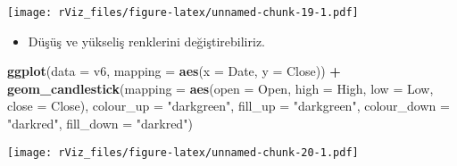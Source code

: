 \documentclass[
]{book}
\newenvironment{Shaded}{\begin{snugshade}}{\end{snugshade}}
\newcommand{\CommentTok}[1]{\textcolor[rgb]{0.56,0.35,0.01}{\textit{#1}}}
\newcommand{\DataTypeTok}[1]{\textcolor[rgb]{0.13,0.29,0.53}{#1}}
\newcommand{\KeywordTok}[1]{\textcolor[rgb]{0.13,0.29,0.53}{\textbf{#1}}}
\newcommand{\NormalTok}[1]{#1}
\newcommand{\OperatorTok}[1]{\textcolor[rgb]{0.81,0.36,0.00}{\textbf{#1}}}
\newcommand{\StringTok}[1]{\textcolor[rgb]{0.31,0.60,0.02}{#1}}
\providecommand{\tightlist}{%
  \setlength{\itemsep}{0pt}\setlength{\parskip}{0pt}}
\begin{document}
\begin{Shaded}
\end{Shaded}

\texttt{[image: rViz\_files/figure-latex/unnamed-chunk-19-1.pdf]}

\begin{itemize}
\tightlist
\item
  Düşüş ve yükseliş renklerini değiştirebiliriz.
\end{itemize}

\begin{Shaded}
\begin{Highlighting}[]
\KeywordTok{ggplot}\NormalTok{(}\DataTypeTok{data =}\NormalTok{ v6, }\DataTypeTok{mapping =} \KeywordTok{aes}\NormalTok{(}\DataTypeTok{x =}\NormalTok{ Date, }\DataTypeTok{y =}\NormalTok{ Close)) }\OperatorTok{+}
\StringTok{  }\KeywordTok{geom_candlestick}\NormalTok{(}\DataTypeTok{mapping =} \KeywordTok{aes}\NormalTok{(}\DataTypeTok{open =}\NormalTok{ Open, }\DataTypeTok{high =}\NormalTok{ High, }\DataTypeTok{low =}\NormalTok{ Low, }\DataTypeTok{close =}\NormalTok{ Close),}
                   \DataTypeTok{colour_up =} \StringTok{"darkgreen"}\NormalTok{, }\DataTypeTok{fill_up =} \StringTok{"darkgreen"}\NormalTok{,}
                   \DataTypeTok{colour_down =} \StringTok{"darkred"}\NormalTok{, }\DataTypeTok{fill_down =} \StringTok{"darkred"}\NormalTok{)}
\end{Highlighting}
\end{Shaded}

\texttt{[image: rViz\_files/figure-latex/unnamed-chunk-20-1.pdf]}
\end{document}
